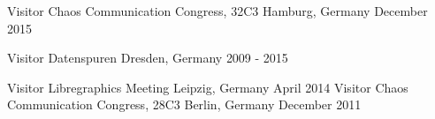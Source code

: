 \begin{cventries}

  \cventry
    {Visitor}
    {Chaos Communication Congress, 32C3}
    {Hamburg, Germany}
    {December 2015}
    {
    }

  \cventry
    {Visitor}
    {Datenspuren}
    {Dresden, Germany}
    {2009 - 2015}
    {
    }

  \cventry
    {Visitor}
    {Libregraphics Meeting}
    {Leipzig, Germany}
    {April 2014}
    {
    }
  \cventry
    {Visitor}
    {Chaos Communication Congress, 28C3}
    {Berlin, Germany}
    {December 2011}
    {
    }
\end{cventries}
